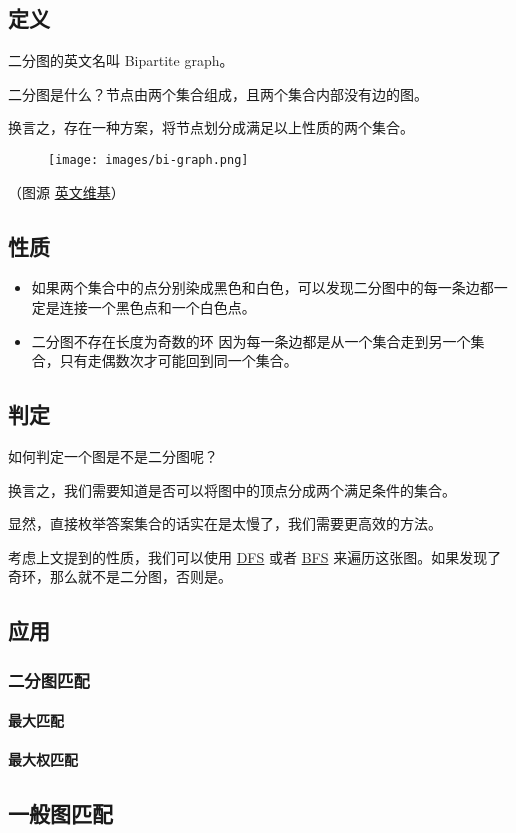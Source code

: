 
\subsection{定义}

二分图的英文名叫 Bipartite graph。

二分图是什么？节点由两个集合组成，且两个集合内部没有边的图。

换言之，存在一种方案，将节点划分成满足以上性质的两个集合。

\begin{figure}[h]
\centering
\texttt{[image: images/bi-graph.png]} 

\end{figure}

（图源 \href{https://en.wikipedia.org/wiki/Bipartite_graph}{英文维基}）

\subsection{性质}

\begin{itemize}
\item 如果两个集合中的点分别染成黑色和白色，可以发现二分图中的每一条边都一定是连接一个黑色点和一个白色点。
\item \begin{QUESTION}{二分图不存在长度为奇数的环}{}
  因为每一条边都是从一个集合走到另一个集合，只有走偶数次才可能回到同一个集合。
\end{QUESTION}

\end{itemize}

\subsection{判定}

如何判定一个图是不是二分图呢？

换言之，我们需要知道是否可以将图中的顶点分成两个满足条件的集合。

显然，直接枚举答案集合的话实在是太慢了，我们需要更高效的方法。

考虑上文提到的性质，我们可以使用 \href{/search/dfs}{DFS} 或者 \href{/search/bfs}{BFS} 来遍历这张图。如果发现了奇环，那么就不是二分图，否则是。

\subsection{应用}

\subsubsection{二分图匹配}

\paragraph{最大匹配}

\paragraph{最大权匹配}

\subsection{一般图匹配}
